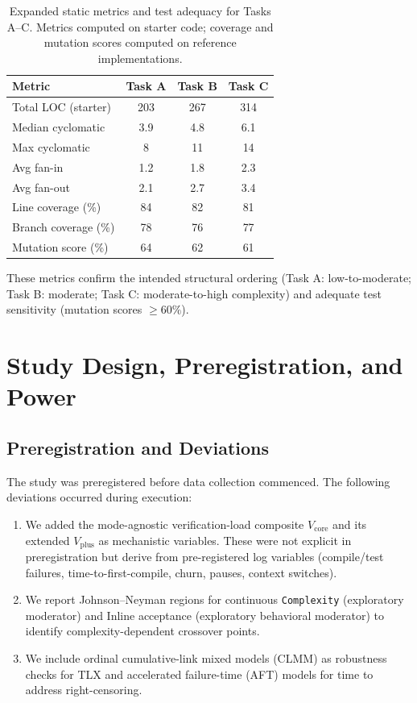 \documentclass[sigconf]{acmart}
\begin{document}
\begin{table}[h!]
  \centering
  \caption{Expanded static metrics and test adequacy for Tasks A--C. Metrics computed on starter code; coverage and mutation scores computed on reference implementations.}
  \label{tab:task-static-details}
  \small
  \begin{tabular}{lccc}
    \toprule
    \textbf{Metric} & \textbf{Task A} & \textbf{Task B} & \textbf{Task C} \\
    \midrule
    Total LOC (starter) & 203 & 267 & 314 \\
    Median cyclomatic & 3.9 & 4.8 & 6.1 \\
    Max cyclomatic & 8 & 11 & 14 \\
    Avg fan-in & 1.2 & 1.8 & 2.3 \\
    Avg fan-out & 2.1 & 2.7 & 3.4 \\
    Line coverage (\%) & 84 & 82 & 81 \\
    Branch coverage (\%) & 78 & 76 & 77 \\
    Mutation score (\%) & 64 & 62 & 61 \\
    \bottomrule
  \end{tabular}
\end{table}

These metrics confirm the intended structural ordering (Task A: low-to-moderate; Task B: moderate; Task C: moderate-to-high complexity) and adequate test sensitivity (mutation scores $\ge60\%$).

\section{Study Design, Preregistration, and Power}
\label{app:prereg-power}
\subsection{Preregistration and Deviations}

The study was preregistered before data collection commenced. The following deviations occurred during execution:

\begin{enumerate}[leftmargin=1.5em]
  \item We added the mode-agnostic verification-load composite \(V_{\text{core}}\) and its extended \(V_{\text{plus}}\) as mechanistic variables. These were not explicit in preregistration but derive from pre-registered log variables (compile/test failures, time-to-first-compile, churn, pauses, context switches).
  \item We report Johnson--Neyman regions for continuous \texttt{Complexity} (exploratory moderator) and Inline acceptance (exploratory behavioral moderator) to identify complexity-dependent crossover points.
  \item We include ordinal cumulative-link mixed models (CLMM) as robustness checks for TLX and accelerated failure-time (AFT) models for time to address right-censoring.
\end{enumerate}
\end{document}

